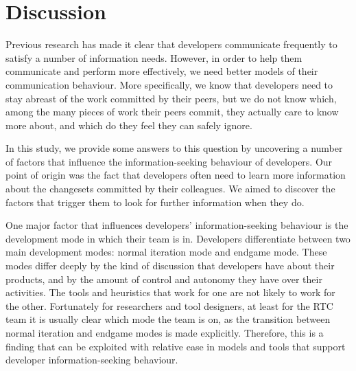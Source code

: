 \documentclass{sig-alternate}
\begin{document}




\section{Discussion}
\label{sec:implications}

Previous research has made it clear that developers communicate frequently to satisfy a number of information needs. However, in order to help them communicate and perform more effectively, we need better models of their communication behaviour. More specifically, we know that developers need to stay abreast of the work committed by their peers, but we do not know which, among the many pieces of work their peers commit, they actually care to know more about, and which do they feel they can safely ignore.

In this study, we provide some answers to this question by uncovering a number of factors that influence the information-seeking behaviour of developers. Our point of origin was the fact that developers often need to learn more information about the changesets committed by their colleagues. We aimed to discover the factors that trigger them to look for further information when they do.

One major factor that influences developers' information-seeking behaviour is the development mode in which their team is in. Developers differentiate between two main development modes: normal iteration mode and endgame mode. These modes differ deeply by the kind of discussion that developers have about their products, and by the amount of control and autonomy they have over their activities. The tools and heuristics that work for one are not likely to work for the other. Fortunately for researchers and tool designers, at least for the RTC team it is  usually clear which mode the team is on, as the transition between normal iteration and endgame modes is made explicitly. Therefore, this is a finding that can be exploited with relative ease in models and tools that support developer information-seeking behaviour.
\end{document}
